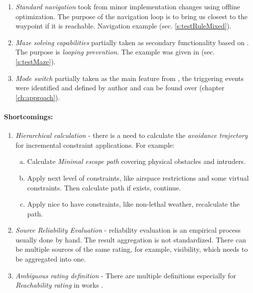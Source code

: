 \begin{enumerate}
    \item \emph{Standard navigation} took from \cite{gardi2018multi} minor implementation changes using offline optimization. The purpose of the navigation loop is to bring us closest to the waypoint if it is reachable. Navigation example (sec. \ref{s:testRuleMixed}).
    
    \item \emph{Maze solving capabilities} partially taken as secondary functionality based on \cite{elshamarka2012design}. The purpose is \emph{looping prevention}. The example was given in (sec. \ref{s:testMaze}).
    
    \item \emph{Mode switch} partially taken as the main feature from \cite{ryan2005mode}, the triggering events were identified and defined by author and can be found over (chapter \ref{ch:approach}).
\end{enumerate}

\paragraph{Shortcomings:} 

\begin{enumerate}
    \item \emph{Hierarchical calculation} - there is a need to calculate the \emph{avoidance trajectory} for incremental constraint applications. For example:
    \begin{enumerate}[a.]
        \item Calculate \emph{Minimal escape path} covering physical obstacles and intruders.
        \item Apply next level of constraints, like airspace restrictions and some virtual constraints. Then calculate path if exists, continue.
        \item Apply nice to have constraints, like non-lethal weather, recalculate the path.
    \end{enumerate}
    
    \item \emph{Source Reliability Evaluation} -  reliability evaluation is an empirical process usually done by hand. The result aggregation is not standardized. There can be multiple sources of the same rating, for example, visibility, which needs to be aggregated into one.  
    
    \item \emph{Ambiguous rating definition} - There are multiple definitions especially for \emph{Reachability rating} in works \cite{kothari2013probabilistically,blackmore2006probabilistic,gessel1986probabilistic}.
    
\end{enumerate}


